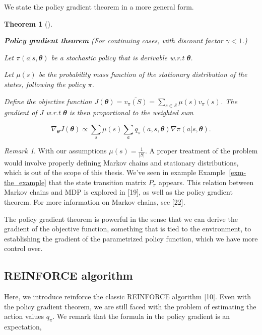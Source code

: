 \documentclass[
  letterpaper,
]{report}
\theoremstyle{definition}
\theoremstyle{plain}
\newtheorem{theorem}{Theorem}[chapter]
\theoremstyle{definition}
\theoremstyle{remark}
\newtheorem*{remark}{Remark}
\begin{document}
We state the policy gradient theorem in a more general form.

\begin{theorem}[]\protect\hypertarget{thm-policyGradient}{}\label{thm-policyGradient}

\textbf{Policy gradient theorem} (For continuing cases, with discount
factor \(\gamma < 1\).)

Let \(\pi(a|s,\mathbfit{\theta})\) be a stochastic policy that is
derivable w.r.t \(\mathbfit{\theta}\).

Let \(\mu(s)\) be the probability mass function of the stationary
distribution of the states, following the policy \(\pi\).

Define the objective function
\(J(\mathbfit{\theta}) = \overline{v_\pi(S)} = \sum_{s\in \mathcal{S}}\mu(s)v_\pi(s)\).
The gradient of \(J\) w.r.t \(\mathbfit{\theta}\) is then proportional
to the weighted sum

\[
\nabla_{\mathbfit{\theta}} J({\mathbfit{\theta}}) \propto \sum_s \mu(s) \sum_a q_\pi(a,s, {\mathbfit{\theta}})\nabla \pi(a|s, {\mathbfit{\theta}}).
\]

\end{theorem}

\begin{remark}
With our assumptions \(\mu(s) = \frac{1}{|S|}\). A proper treatment of
the problem would involve properly defining Markov chains and stationary
distributions, which is out of the scope of this thesis. We've seen in
example Example~\ref{exm-the_example} that the state transition matrix
\(P_\pi\) appears. This relation between Markov chains and MDP is
explored in {[}19{]}, as well as the policy gradient theorem. For more
information on Markov chains, see {[}22{]}.
\end{remark}

The policy gradient theorem is powerful in the sense that we can derive
the gradient of the objective function, something that is tied to the
environment, to establishing the gradient of the parametrized policy
function, which we have more control over.

\subsection{REINFORCE algorithm}\label{reinforce-algorithm}

Here, we introduce reinforce the classic REINFORCE algorithm {[}10{]}.
Even with the policy gradient theorem, we are still faced with the
problem of estimating the action values \(q_\pi\). We remark that the
formula in the policy gradient is an expectation,
\end{document}
